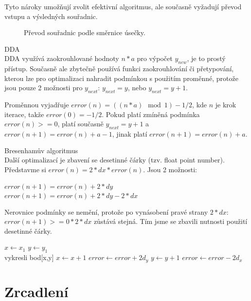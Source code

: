 \documentclass[a4paper,12pt]{book}
\begin{document}
Tyto nároky umožňují zvolit efektivní algoritmus, ale současně vyžadují převod vstupu a výsledných souřadnic.\\

\begin{figure}[H]
  \centering
  
  \caption{Převod souřadnic podle směrnice úsečky.}
\end{figure}




DDA\\
DDA využívá zaokrouhlované hodnoty $n*a$ pro výpočet $y_{new}$, je to prostý přístup. Současně ale zbytečně používá funkci zaokrouhlování či přetypování, kterou lze pro optimalizaci nahradit podmínkou s použitím proměnné,
protože jsou pouze 2 možnosti pro $y_{next}$: $y_{next} = y$, nebo $y_{next} = y+1$.

Proměnnou vyjadřuje $error(n)=((n*a)\mod1)-1/2$, kde $n$ je krok iterace, takže $error(0) = -1/2$.
Pokud platí zmíněná podmínka $error(n) >= 0$, platí současně $y_{next}=y+1$ a $error(n+1) = error(n) + a - 1$, jinak platí $error(n+1) = error(n) + a$.


Bresenhamův algoritmus\\
Další optimalizací je zbavení se desetinné čárky (tzv. float point number).
Představme si $error(n) = 2*dx*error(n)$. Jsou 2 možnosti:


$error(n+1)=error(n)+2*dy$\\
$error(n+1)=error(n)+2*dy-2*dx$

Nerovnice podmínky se nemění, protože po vynásobení pravé strany $2*dx$: $error(n+1)>=0*2*dx$ zůstává stejná.
Tím jsme se zbavili nutnosti použití desetinné čárky.






\begin{algorithmic}
\State $x \gets x_1$
\State $y \gets y_1$
\\vykresli bod[x,y]
\State $x \gets x + 1$
\State $error \gets error + 2d_y$
    \State $y \gets y + 1$
    \State $error \gets error - 2d_x$
\EndIf 
\EndWhile
\end{algorithmic}





\section{Zrcadlení}
\end{document}
